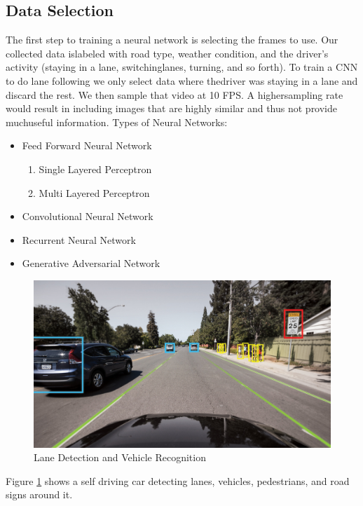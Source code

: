 \documentclass[a4paper]{report}
\begin{document}
		\subsection{Data Selection}
		\label{subsec1}	
		The  first  step  to  training  a  neural  network  is  selecting  the  frames  to  use.   Our  collected  data  islabeled with road type,  weather condition,  and the driver’s activity (staying in a lane,  switchinglanes, turning, and so forth).  To train a CNN to do lane following we only select data where thedriver was staying in a lane and discard the rest.  We then sample that video at 10 FPS. A highersampling rate would result in including images that are highly similar and thus not provide muchuseful information.
		Types of Neural Networks:
		\begin{itemize}
			\item Feed Forward Neural Network
				\begin{enumerate}
					\item Single Layered Perceptron
					\item Multi Layered Perceptron
				\end{enumerate}
			\item Convolutional Neural Network
			\item Recurrent Neural Network
			\item Generative Adversarial Network
		\end{itemize}
		\begin{figure}[h] 
			\includegraphics[width=\linewidth]{latex1.jpg}
			\caption{Lane Detection and Vehicle Recognition}
			\label{figref1}
		\end{figure}
		
		Figure \ref{figref1} shows a self driving car detecting lanes, vehicles, pedestrians, and road signs around it.
		
		
		
	
	
\end{document}
